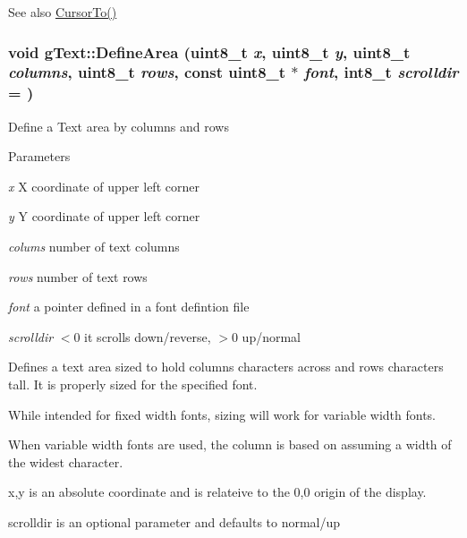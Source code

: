 \begin{DoxySeeAlso}{See also}
\hyperlink{classg_text_a7ce5b6e29b0d26d85064e6235927af75}{CursorTo()} 
\end{DoxySeeAlso}
\hypertarget{classg_text_a99a194bcdd6f57e27752da45a8cf4a86}{
\subsubsection[{DefineArea}]{\setlength{\rightskip}{0pt plus 5cm}void gText::DefineArea (uint8\_\-t {\em x}, \/  uint8\_\-t {\em y}, \/  uint8\_\-t {\em columns}, \/  uint8\_\-t {\em rows}, \/  const uint8\_\-t $\ast$ {\em font}, \/  int8\_\-t {\em scrolldir} = {})}}
\label{classg_text_a99a194bcdd6f57e27752da45a8cf4a86}
Define a Text area by columns and rows


\begin{DoxyParams}{Parameters}
\item[{\em x}]X coordinate of upper left corner \item[{\em y}]Y coordinate of upper left corner \item[{\em colums}]number of text columns \item[{\em rows}]number of text rows \item[{\em font}]a pointer defined in a font defintion file \item[{\em scrolldir}]$<$0 it scrolls down/reverse, $>$0 up/normal\end{DoxyParams}
Defines a text area sized to hold columns characters across and rows characters tall. It is properly sized for the specified font.

While intended for fixed width fonts, sizing will work for variable width fonts.

When variable width fonts are used, the column is based on assuming a width of the widest character.

x,y is an absolute coordinate and is relateive to the 0,0 origin of the display.

scrolldir is an optional parameter and defaults to normal/up

